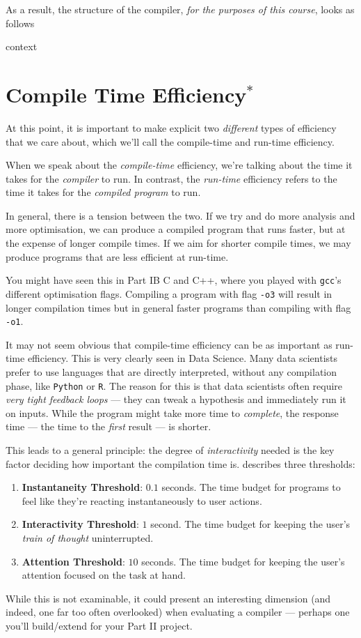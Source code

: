 As a result, the structure of the compiler, \textit{for the purposes of this course}, looks as follows

\begin{center}
    {context}
\end{center}

\section{Compile Time Efficiency$^{*}$}
At this point, it is important to make explicit two \emph{different} types of efficiency that we care about, which we'll call the compile-time and run-time efficiency.

When we speak about the \emph{compile-time} efficiency, we're talking about the time it takes for the \emph{compiler} to run. In contrast, the \emph{run-time} efficiency refers to the time it takes for the \emph{compiled program} to run.

In general, there is a tension between the two. If we try and do more analysis and more optimisation, we can produce a compiled program that runs faster, but at the expense of longer compile times. If we aim for shorter compile times, we may produce programs that are less efficient at run-time.

You might have seen this in {\sffamily Part IB C and C++}, where you played with \texttt{gcc}'s different optimisation flags. Compiling a program with flag \texttt{-o3} will result in longer compilation times but in general faster programs than compiling with flag \texttt{-o1}.

It may not seem obvious that compile-time efficiency can be as important as run-time efficiency. This is very clearly seen in Data Science. Many data scientists prefer to use languages that are directly interpreted, without any compilation phase, like \texttt{Python} or \texttt{R}. The reason for this is that data scientists often require \emph{very tight feedback loops} --- they can tweak a hypothesis and immediately run it on inputs. While the program might take more time to \emph{complete}, the response time --- the time to the \emph{first} result --- is shorter. 

This leads to a general principle: the degree of \emph{interactivity} needed is the key factor deciding how important the compilation time is. \citet{nielsen-1993} describes three thresholds:

\begin{enumerate}
    \item \textbf{Instantaneity Threshold}: $0.1$ seconds. The time budget for programs to feel like they're reacting instantaneously to user actions. 
    \item \textbf{Interactivity Threshold}: $1$ second. The time budget for keeping the user's \emph{train of thought} uninterrupted.
    \item \textbf{Attention Threshold}: $10$ seconds. The time budget for keeping the user's attention focused on the task at hand.
\end{enumerate}

While this is not examinable, it could present an interesting dimension (and indeed, one far too often overlooked) when evaluating a compiler --- perhaps one you'll build/extend for your Part II project.